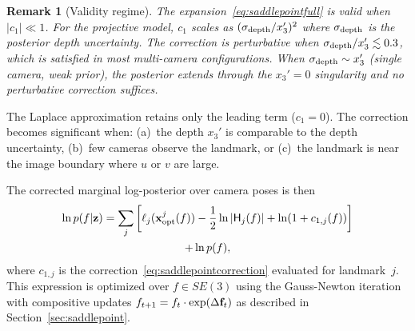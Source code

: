 \documentclass[journal]{IEEEtran}
\newtheorem{remark}{Remark}
\begin{document}
\begin{remark}[Validity regime]
The expansion~\eqref{eq:saddlepointfull} is valid when $|c_1| \ll 1$.
For the projective model, $c_1$ scales as $(\sigma_{\rm depth}/x_3')^2$
where $\sigma_{\rm depth}$ is the posterior depth uncertainty.
The correction is perturbative when $\sigma_{\rm depth}/x_3' \lesssim 0.3$,
which is satisfied in most multi-camera configurations.
When $\sigma_{\rm depth} \sim x_3'$ (single camera, weak prior),
the posterior extends through the $x_3' = 0$ singularity
and no perturbative correction suffices.
\end{remark}

The Laplace approximation retains only the leading term 
($c_1 = 0$). The correction 
becomes significant when:
(a)~the depth $x_3'$ is comparable to the depth uncertainty,
(b)~few cameras observe the landmark, or
(c)~the landmark is near the image boundary where 
$u$ or $v$ are large.

The corrected marginal log-posterior over camera poses is then
\begin{multline}
    \ln p(f | {\bf z}) = \sum_j \left[\ell_j({\bf x}^j_{\rm opt}(f)) 
    - \frac{1}{2}\ln|\mathsf{H}_j(f)| + \ln(1 + c_{1,j}(f))\right]\\
    + \ln p(f),
    \label{eq:correctedmarginal}
\end{multline}
where $c_{1,j}$ is the correction~\eqref{eq:saddlepointcorrection}
evaluated for landmark~$j$.
This expression is optimized over $f \in SE(3)$ using the Gauss-Newton iteration 
with compositive updates $f_{t+1} = f_t \cdot \exp(\Delta{\bf f}_t)$ as described 
in Section~\ref{sec:saddlepoint}.
\end{document}
